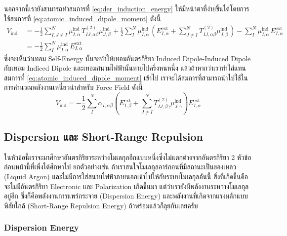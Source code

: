 นอกจากนี้เรายังสามารถทำสมการที่ \eqref{eq:der_induction_energy} ให้มีหน้าตาที่ง่ายขึ้นได้โดยการใช้สมการที่ \eqref{eq:atomic_induced_dipole_moment} ดังนี้
%
\begin{equation}
  \begin{aligned}
    V_{\text{ind }}
     & = -\frac{1}{2} \sum_{I, J \neq I}^N
    \mu_{I, \alpha}^{\text{ind }} T_{I J, \alpha \beta}^{(2)} \mu_{J, \beta}^{\text{ind }}
    +\frac{1}{2} \sum_I^N \mu_{I, \alpha}^{\text{ind }}
    \left(
    E_{I, \alpha}^{\mathrm{ext}}
    +\sum_{J \neq I}^N T_{I J, \alpha \beta}^{(2)} \mu_{J, \beta}^{\text{ind }}
    \right)
    -\sum_I^N \mu_{I, \alpha}^{\text{ind }} E_{I, \alpha}^{\text{ext }}                  \\
     & = -\frac{1}{2} \sum_I^N \mu_{I, \alpha}^{\text{ind }} E_{I, \alpha}^{\text{ext }}
  \end{aligned}
\end{equation}
%
ซึ่งจะเห็นว่าเทอม Self-Energy นั้นจะทำให้เทอมอันตรกิริยา Induced Dipole-Induced Dipole กับเทอม Indiced Dipole และเทอมสนามไฟฟ้านั้นหายไปครึ่งหนหนึ่ง แล้วถ้าหากว่าเราทำใส่แทนสมการที่ \eqref{eq:atomic_induced_dipole_moment} เข้าไป เราจะได้สมการที่สามารถนำไปใช้ในการคำนวณพลังงานเหนี่ยวนำสำหรับ Force Field ดังนี้
%
\begin{equation}
  V_{\mathrm{ind}}
  =
  -\frac{1}{2} \sum_I^N \alpha_{I, \alpha \beta}
  \left(
  E_{I, \beta}^{\mathrm{ext}}
  + \sum_{J \neq I}^N T_{I J, \beta \gamma}^{(2)} \mu_{J, \gamma}^{\mathrm{ind}}
  \right)
  E_{I, \alpha}^{\mathrm{ext}}
\end{equation}

\subsection{Dispersion และ Short-Range Repulsion}

ในหัวข้อนี้เราจะมาศึกษาอันตรกิริยาระหว่างโมเลกุลอีกแบบหนึ่งซึ่งไม่แตกต่างจากอันตรกิริยา 2 หัวข้อก่อนหน้านี้ที่เพิ่งได้ศึกษาไป ยกตัวอย่างเช่น ถ้าเราสนใจโมเลกุลอาร์กอนที่มีสถานะเป็นของเหลว (Liquid Argon) และไม่มีการใส่สนามไฟฟ้าภายนอกเข้าไปให้กับระบบโมเลกุลอันนี้ สิ่งที่เกิดขึ้นคือจะไม่มีอันตรกิริยา Electronic และ Polarization เกิดขึ้นมา แต่ว่าเรายังมีพลังงานระหว่างโมเลกุลอยู่อีก ซึ่งก็คือพลังงานการแพร่กระจาย (Dispersion Energy) และพลังงานที่เกิดจากแรงผลักแบบพิสัยใกล้ (Short-Range Repulsion Energy) ถ้าพร้อมแล้วก็ลุยกันเลยครับ

\subsubsection{Dispersion Energy}

